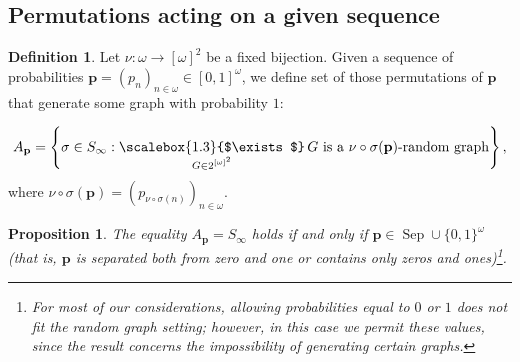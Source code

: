 \documentclass{amsart}
\newtheorem{prop}[theorem]{Proposition}
\theoremstyle{plain}
\theoremstyle{definition}
\newtheorem{df}[theorem]{Definition}
\theoremstyle{remark}
\numberwithin{equation}{section}
\newcommand{\on}{\operatorname}
\begin{document}
\subsection{Permutations acting on a given sequence}
\begin{df}
    Let $\nu:\omega \rightarrow [\omega]^2$ be a fixed bijection. Given a sequence of probabilities $\textbf{p}=(p_n)_{n\in\omega} \in [0,1]^\omega$, we define set of those permutations of $\textbf{p}$ that generate some graph with probability $1$:


\[
A_{\mathbf{p}} = \left\{ \sigma \in S_\infty : 
\mathop{\scalebox{1.3}{$\exists$}}_{\substack{G \in 2^{[\omega]^2}}} 
G \text{ is a } \nu\circ\sigma(\mathbf{p})\text{-random graph} \right\},
\]
where $\nu\circ\sigma(\mathbf{p})=(p_{\nu\circ\sigma(n)})_{n\in\omega}$.
\end{df}

\begin{prop}\label{p:Ap=Sinfty}
The equality \(A_{\mathbf p}=S_\infty\) holds if and only if $\mathbf p\in \on{Sep}\cup\{0,1\}^\omega$ (that is, $\mathbf p$ is separated both from zero and one or contains only zeros and ones)\footnote{For most of our considerations, allowing probabilities equal to $0$ or $1$ does not fit the random graph setting; however, in this case we permit these values, since the result concerns the impossibility of generating certain graphs.}.
\end{prop}
\end{document}

